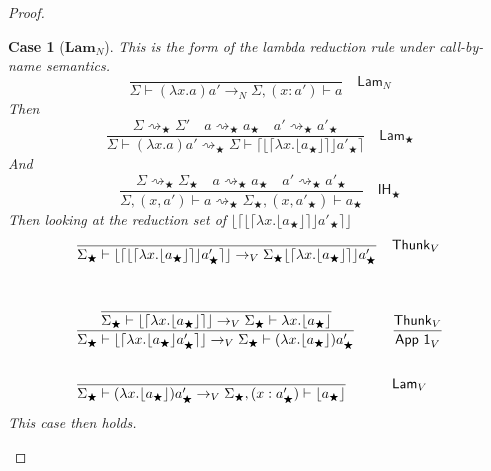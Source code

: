 \documentclass[float=false, crop=false]{standalone}
\newtheorem{case}{Case}
\numberwithin{subcase}{case}
\newcommand{\tlang}{\bigstar}
\newcommand{\thunk}[1]{\lceil #1 \rceil}
\newcommand{\unwrap}[1]{\lfloor #1 \rfloor}
\newcommand{\tcbn}{\rightarrow_N}
\newcommand{\tcbv}{\rightarrow_V}
\newcommand{\tlthunk}{\rightsquigarrow_\tlang}
\begin{document}
\begin{proof}
  \begin{case}[$\mathbf{Lam}_N$]
    This is the form of the lambda reduction rule under call-by-name semantics.
    \[\frac{}{\Sigma \vdash (\lambda x.a)a' \tcbn \Sigma,(x:a') \vdash a }
        \quad \mathsf{Lam}_N\]
    Then \[ \frac{\Sigma \tlthunk \Sigma' \quad 
        a \tlthunk a_\tlang \quad a' \tlthunk a'_\tlang}
      {\Sigma \vdash (\lambda x .a)a' 
        \tlthunk \Sigma \vdash \thunk{\unwrap{
            \thunk{\lambda x. \unwrap{ a_\tlang}}} a'_\tlang} }
              \quad \mathsf{Lam}_\tlang\]
    And \[ \frac{\Sigma \tlthunk \Sigma_\tlang \quad a 
        \tlthunk a_\tlang \quad a' \tlthunk a'_\tlang}
      {\Sigma,(x,a') \vdash a\tlthunk \Sigma_\tlang,
        (x,a'_\tlang) \vdash a_\tlang} \quad \mathsf{IH}_\tlang \]
   Then looking at the reduction set of  
   ${\unwrap{\thunk{\unwrap{
        \thunk{\lambda x. \unwrap{ a_\tlang}}} a'_\tlang}}}$
    \begin{align*}
     &\frac{}{ 
       \Sigma_\tlang \vdash \unwrap{\thunk{\unwrap{\thunk{\lambda x.
               \unwrap{ a_\tlang}}} a'_\tlang}} \tcbv 
       \Sigma_\tlang \unwrap{\thunk{\lambda x.
               \unwrap{ a_\tlang}}} a'_\tlang} && \mathsf{Thunk}_V \\ \\
     &\cfrac{\cfrac{}{\Sigma_\tlang \vdash \unwrap{\thunk{\lambda x.
           \unwrap{ a_\tlang}}} \tcbv  \Sigma_\tlang \vdash \lambda x.
       \unwrap{a_\tlang}}}{ 
       \Sigma_\tlang \vdash \unwrap{\thunk{\lambda x.
               \unwrap{ a_\tlang} a'_\tlang}} \tcbv 
           \Sigma_\tlang \vdash (\lambda x.\unwrap{a_\tlang}) a'_\tlang} && 
         \frac{\mathsf{Thunk}_V}{\mathsf{App\ 1}_V}\\ \\
     &\frac{}{\Sigma_\tlang \vdash (\lambda x.\unwrap{a_\tlang})a'_\tlang \tcbv 
       \Sigma_\tlang, (x:a_\tlang') \vdash \unwrap{a_\tlang}} && \mathsf{Lam}_V
    \end{align*}
    This case then holds.
  \end{case}


\end{proof}
\end{document}
